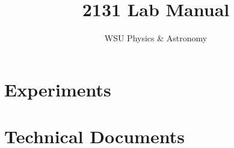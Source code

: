 \documentclass[hidelinks,12pt,letterpaper,twoside]{book}
\author{WSU Physics \& Astronomy}
\title{2131 Lab Manual}
\newcommand\blankpage{%
    \null
    \thispagestyle{empty}%
    \newpage}
\begin{document}
\maketitle

\newpage{\blankpage}



\newpage{\blankpage}

\renewcommand\contentsname{PHY 2131: Physics for Life Sciences}
\setcounter{tocdepth}{1}
\tableofcontents{\thispagestyle{fancy}}

\part{Experiments}
\renewcommand{\chaptername}{Experiment}






\newpage{\blankpage}

\part{Technical Documents}
\renewcommand{\chaptername}{Technical Document}
\renewcommand\thechapter{\Alph{chapter}}
\newpage{\blankpage}
\newpage{\blankpage}
\end{document}
